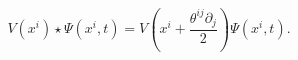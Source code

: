 \begin{equation}
V(x^{i})\star\Psi(x^{i},t)=V\left(  x^{i}+\frac{\theta^{ij}\partial_{j}}%
{2}\right)  \Psi(x^{i},t).\label{27}%
\end{equation}

